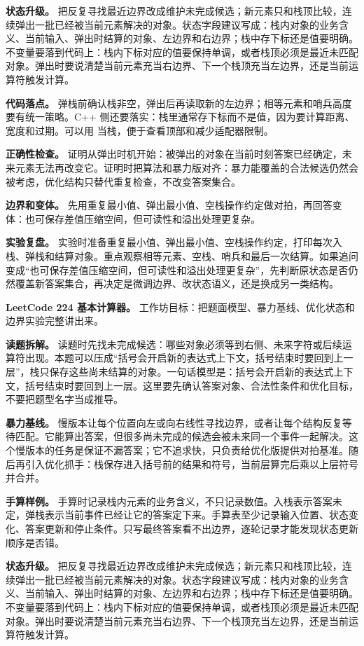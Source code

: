 \textbf{状态升级。} 把反复寻找最近边界改成维护未完成候选；新元素只和栈顶比较，连续弹出一批已经被当前元素解决的对象。状态字段建议写成：栈内对象的业务含义、当前输入、弹出时结算的对象、左边界和右边界；栈中存下标还是值要明确。不变量要落到代码上：栈内下标对应的值要保持单调，或者栈顶必须是最近未匹配对象。弹出时要说清楚当前元素充当右边界、下一个栈顶充当左边界，还是当前运算符触发计算。

\textbf{代码落点。} 弹栈前确认栈非空，弹出后再读取新的左边界；相等元素和哨兵高度要有统一策略。C++ 侧还要落实：栈里通常存下标而不是值，因为要计算距离、宽度和过期。可以用  当栈，便于查看顶部和减少适配器限制。

\textbf{正确性检查。} 证明从弹出时机开始：被弹出的对象在当前时刻答案已经确定，未来元素无法再改变它。证明时把算法和暴力版对齐：暴力能覆盖的合法候选仍然会被考虑，优化结构只替代重复检查，不改变答案集合。

\textbf{边界和变体。} 先用重复最小值、弹出最小值、空栈操作约定做对拍，再回答变体：也可保存差值压缩空间，但可读性和溢出处理更复杂。

\textbf{实验复盘。} 实验时准备重复最小值、弹出最小值、空栈操作约定，打印每次入栈、弹栈和结算对象。重点观察相等元素、空栈、哨兵和最后一次结算。如果追问变成“也可保存差值压缩空间，但可读性和溢出处理更复杂”，先判断原状态是否仍然覆盖新答案集合，再决定是微调边界、改状态语义，还是换成另一类结构。

\noindent\textbf{LeetCode 224 基本计算器。} 工作坊目标：把题面模型、暴力基线、优化状态和边界实验完整讲出来。

\textbf{读题拆解。} 读题时先找未完成候选：哪些对象必须等到右侧、未来字符或后续运算符出现。本题可以压成“括号会开启新的表达式上下文，括号结束时要回到上一层”，栈只保存这些尚未结算的对象。一句话模型是：括号会开启新的表达式上下文，括号结束时要回到上一层。这里要先确认答案对象、合法性条件和优化目标，不要把题型名字当成推导。

\textbf{暴力基线。} 慢版本让每个位置向左或向右线性寻找边界，或者让每个结构反复等待匹配。它能算出答案，但很多尚未完成的候选会被未来同一个事件一起解决。这个慢版本的任务是保证不漏答案；它不追求快，只负责给优化版提供对拍基准。随后再引入优化抓手：栈保存进入括号前的结果和符号，当前层算完后乘以上层符号并合并。

\textbf{手算样例。} 手算时记录栈内元素的业务含义，不只记录数值。入栈表示答案未定，弹栈表示当前事件已经让它的答案定下来。手算表至少记录输入位置、状态变化、答案更新和停止条件。只写最终答案看不出边界，逐轮记录才能发现状态更新顺序是否错。

\textbf{状态升级。} 把反复寻找最近边界改成维护未完成候选；新元素只和栈顶比较，连续弹出一批已经被当前元素解决的对象。状态字段建议写成：栈内对象的业务含义、当前输入、弹出时结算的对象、左边界和右边界；栈中存下标还是值要明确。不变量要落到代码上：栈内下标对应的值要保持单调，或者栈顶必须是最近未匹配对象。弹出时要说清楚当前元素充当右边界、下一个栈顶充当左边界，还是当前运算符触发计算。

